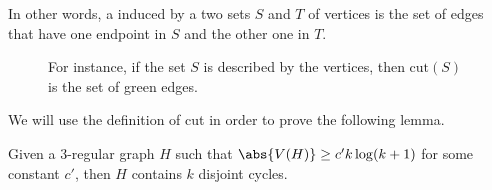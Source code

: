 \documentclass[a4paper, 12pt]{report}
\begin{document}
    In other words, a  induced by a two sets $S$ and $T$ of vertices is the set of edges that have one endpoint in $S$ and the other one in $T$.

    \begin{figure}[H]
        \centering
        \caption{For instance, if the set $S$ is described by the  vertices, then $\mathrm{cut}(S)$ is the set of green edges.}
    \end{figure}

    We will use the definition of cut in order to prove the following lemma.

    \begin{framedlem}{}
        Given a 3-regular graph $H$ such that $\abs{V(H)} \ge c'k \log (k +1)$ for some constant $c'$, then $H$ contains $k$ disjoint cycles.
    \end{framedlem}
\end{document}

